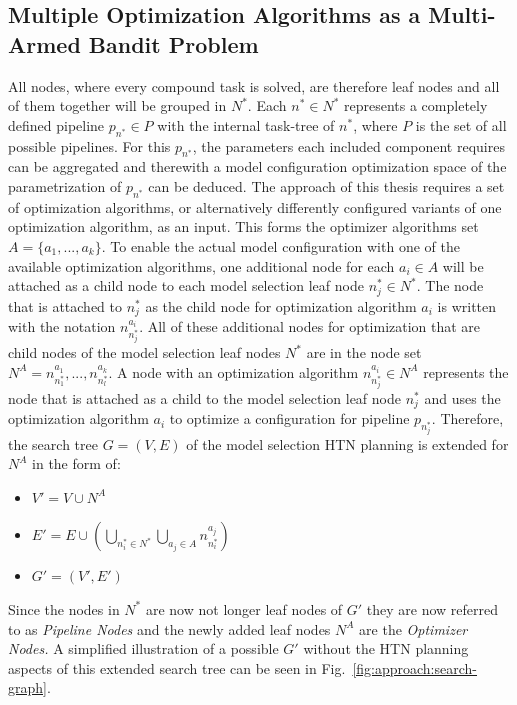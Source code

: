 \subsection{Multiple Optimization Algorithms as a Multi-Armed Bandit Problem}
\label{sec:approach:selection:bandit}
All nodes, where every compound task is solved, are therefore leaf nodes and all of them together will be grouped in $N^*$.
Each $n^* \in N^*$ represents a completely defined pipeline $p_{n^*} \in P$ with the internal task-tree of $n^*$, where $P$ is the set of all possible pipelines.
For this $p_{n^*}$, the parameters each included component requires can be aggregated and therewith a model configuration optimization space of the parametrization of $p_{n^*}$ can be deduced.\newline
The approach of this thesis requires a set of optimization algorithms, or alternatively differently configured variants of one optimization algorithm, as an input.
This forms the optimizer algorithms set  $A = \{ a_1, ..., a_k \}$.
To enable the actual model configuration with one of the available optimization algorithms, one additional node for each $a_i \in A$ will be attached as a child node to each model selection leaf node $n^*_j \in N^*$.
The node that is attached to $n^*_j$ as the child node for optimization algorithm $a_i$ is written with the notation $n_{n^*_j}^{a_i}$.
All of these additional nodes for optimization that are child nodes of the model selection leaf nodes $N^*$ are in the node set $N^A = {n^{a_1}_{n^*_1}, ... , n^{a_k}_{n^*_l}}$.
A node with an optimization algorithm $n^{a_i}_{n^*_j} \in N^A$ represents the node that is attached as a child to the model selection leaf node $n^*_j$ and uses the optimization algorithm $a_i$ to optimize a configuration for pipeline $p_{n^*_j}$.\newline
Therefore, the search tree $G=(V, E)$ of the model selection HTN planning is extended for $N^A$ in the form of:
\begin{itemize}
    \item $V'=V \cup N^A$
    \item $E'=E \cup \left( \bigcup_{n^*_i \in N^*} \bigcup_{a_j \in A} n^{a_j}_{n^*_i} \right)$
    \item $G' = (V', E')$
\end{itemize}
Since the nodes in $N^*$ are now not longer leaf nodes of $G'$ they are now referred to as \textit{Pipeline Nodes} and the newly added leaf nodes $N^A$ are the \textit{Optimizer Nodes.}
A simplified illustration of a possible $G'$ without the HTN planning aspects of this extended search tree can be seen in Fig.~\ref{fig:approach:search-graph}.
